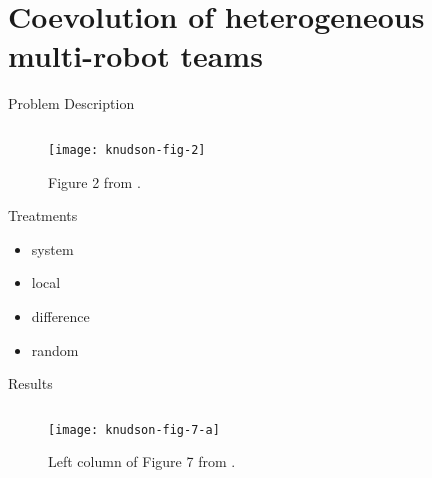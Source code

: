 \section{Coevolution of heterogeneous multi-robot teams \cite{knudson2010coevolution}}

\begin{frame}{Problem Description}

\begin{figure}

\begin{columns}
\begin{column}{0.7\textwidth}
\texttt{[image: knudson-fig-2]}
\end{column}
\begin{column}{0.3\textwidth}
\caption{
Figure 2 from \cite{knudson2010coevolution}.
}
\end{column}
\end{columns}
\end{figure}

\end{frame}

\begin{frame}{Treatments}

\begin{itemize}
\item system
\item local
\item difference
\item random
\end{itemize}

\end{frame}

\begin{frame}{Results}

\begin{figure}

\begin{columns}
\begin{column}{0.7\textwidth}
\texttt{[image: knudson-fig-7-a]}
\end{column}
\begin{column}{0.3\textwidth}
\caption{
Left column of Figure 7 from \cite{knudson2010coevolution}.
}
\end{column}
\end{columns}

\end{figure}

\end{frame}

